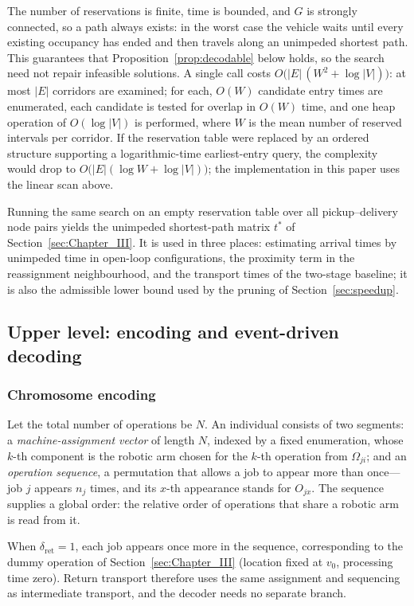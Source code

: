 \documentclass[manuscript,screen,review]{acmart}
\begin{document}
The number of reservations is finite, time is bounded, and $G$ is strongly connected, so a path always exists: in the worst case the vehicle waits until every existing occupancy has ended and then travels along an unimpeded shortest path.
This guarantees that Proposition~\ref{prop:decodable} below holds, so the search need not repair infeasible solutions.
A single call costs $O\bigl(|E|\,(W^{2}+\log|V|)\bigr)$: at most $|E|$ corridors are examined; for each, $O(W)$ candidate entry times are enumerated, each candidate is tested for overlap in $O(W)$ time,
and one heap operation of $O(\log|V|)$ is performed, where $W$ is the mean number of reserved intervals per corridor.
If the reservation table were replaced by an ordered structure supporting a logarithmic-time earliest-entry query, the complexity would drop to $O\bigl(|E|(\log W+\log|V|)\bigr)$; the implementation in this paper uses the linear scan above.

Running the same search on an empty reservation table over all pickup--delivery node pairs yields the unimpeded shortest-path matrix $t^{*}$ of Section~\ref{sec:Chapter_III}.
It is used in three places: estimating arrival times by unimpeded time in open-loop configurations, the proximity term in the reassignment neighbourhood, and the transport times of the two-stage baseline; it is also the admissible lower bound used by the pruning of Section~\ref{sec:speedup}.


\subsection{Upper level: encoding and event-driven decoding}
\label{sec:upper}

\subsubsection{Chromosome encoding}
Let the total number of operations be $N$. An individual consists of two segments: a \emph{machine-assignment vector} of length $N$, indexed by a fixed enumeration, whose $k$-th component is the robotic arm chosen for the $k$-th operation from $\Omega_{ji}$;
and an \emph{operation sequence}, a permutation that allows a job to appear more than once---job $j$ appears $n_j$ times, and its $x$-th appearance stands for $O_{jx}$.
The sequence supplies a global order: the relative order of operations that share a robotic arm is read from it.

When $\delta_{\mathrm{ret}}=1$, each job appears once more in the sequence, corresponding to the dummy operation of Section~\ref{sec:Chapter_III} (location fixed at $v_0$, processing time zero).
Return transport therefore uses the same assignment and sequencing as intermediate transport, and the decoder needs no separate branch.
\end{document}
